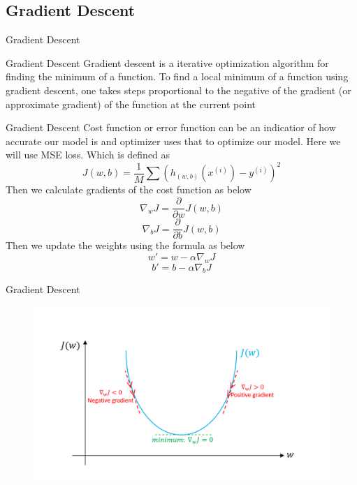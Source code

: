 \documentclass[10pt]{beamer}
\begin{document}
			\subsection{Gradient Descent}
			\begin{frame}{Gradient Descent}
			\begin{block}{Gradient Descent}
			Gradient descent is a iterative optimization algorithm for finding the minimum of a function. To find a local minimum of a function using gradient descent, one takes steps proportional to the negative of the gradient (or approximate gradient) of the function at the current point
			\end{block}			
			\end{frame}
			\begin{frame}{Gradient Descent}
				Cost function or error function  can be an indicatior of how accurate our model is and optimizer uses that to optimize our model. Here we will use MSE loss. Which is defined as
				\begin{equation}
					J(w,b)=\dfrac{1}{M}\sum(h_{(w,b)}(x^{(i)})-y^{(i)})^2
				\end{equation}
				Then we calculate gradients of the cost function as below
				\begin{equation}
					\nabla_w J =\dfrac{\partial}{\partial{w}} J(w,b)
				\end{equation}
				\begin{equation}
				\nabla_b J=\dfrac{\partial}{\partial{b}} J(w,b)
				\end{equation}
				Then we update the weights using the formula as below
				\begin{equation}
				w{}'=w-\alpha \nabla_wJ
				\end{equation}
				\begin{equation}
					b{}'=b-\alpha \nabla_bJ
				\end{equation}
			\end{frame}
			\begin{frame}{Gradient Descent}
					\begin{figure}
					\includegraphics[width=10 cm,keepaspectratio]{images/graddec3}		
				\end{figure}
			\end{frame}				
							
\end{document}
